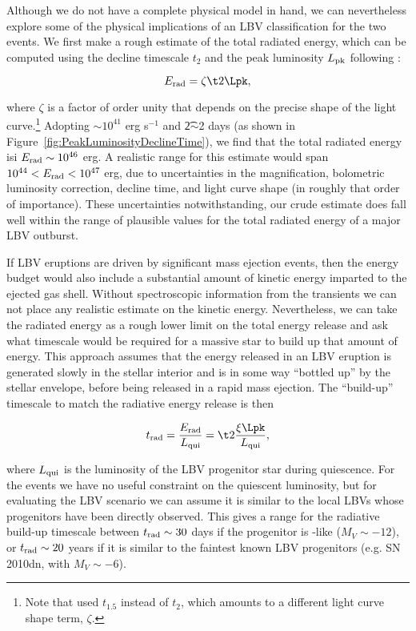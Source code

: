 Although we do not have a complete physical model in hand, we can
nevertheless explore some of the physical implications of an LBV
classification for the two \spock events.  We first make a rough
estimate of the total radiated energy, which can be computed using the
decline timescale $t_2$ and the peak luminosity $L_{\rm pk}$ following
\citet{Smith:2011b}:

\begin{equation}
  \label{eqn:Erad}
  E_{\rm rad} = \zeta \t2 \Lpk,
\end{equation}

\noindent where $\zeta$ is a factor of order unity that depends on the
precise shape of the light curve.\footnote{Note that
  \citet{Smith:2011b} used $t_{1.5}$ instead of $t_2$, which amounts
  to a different light curve shape term, $\zeta$.}  Adopting
\Lpk$\sim10^{41}$ erg s$^{-1}$ and \t2$\sim$2 days (as shown in
Figure~\ref{fig:PeakLuminosityDeclineTime}), we find that the total
radiated energy isi $E_{\rm rad}\sim10^{46}$ erg.  A realistic range
for this estimate would span $10^{44}<E_{\rm rad}<10^{47}$ erg, due to
uncertainties in the magnification, bolometric luminosity correction,
decline time, and light curve shape (in roughly that order of
importance). These uncertainties notwithstanding, our crude estimate
does fall well within the range of plausible values for the total
radiated energy of a major LBV outburst.

If LBV eruptions are driven by significant mass ejection events, then
the energy budget would also include a substantial amount of kinetic
energy imparted to the ejected gas shell. Without spectroscopic
information from the \spock transients we can not place any realistic
estimate on the kinetic energy. Nevertheless, we can take the radiated
energy as a rough lower limit on the total energy release and ask what
timescale would be required for a massive star to build up that amount
of energy. This approach assumes that the energy released in an LBV
eruption is generated slowly in the stellar interior and is in some
way ``bottled up'' by the stellar envelope, before being released in a
rapid mass ejection.  The ``build-up'' timescale to match the
radiative energy release is then

\begin{equation}
  \label{eqn:trad}
t_{\rm rad} = \frac{E_{\rm rad}}{L_{\rm qui}} = \t2 \frac{\xi\Lpk}{L_{\rm qui}},
\end{equation}

\noindent where $L_{\rm qui}$ is the luminosity of the LBV progenitor
star during quiescence. For the \spock events we have no useful
constraint on the quiescent luminosity, but for evaluating the LBV
scenario we can assume it is similar to the local LBVs whose
progenitors have been directly observed.  This gives a range for the
radiative build-up timescale between $t_{\rm rad}\sim30$ days if the
progenitor is \etacar-like ($M_V\sim-12$), or $t_{\rm rad}\sim20$
years if it is similar to the faintest known LBV progenitors (e.g. SN
2010dn, with $M_V\sim-6$).  

